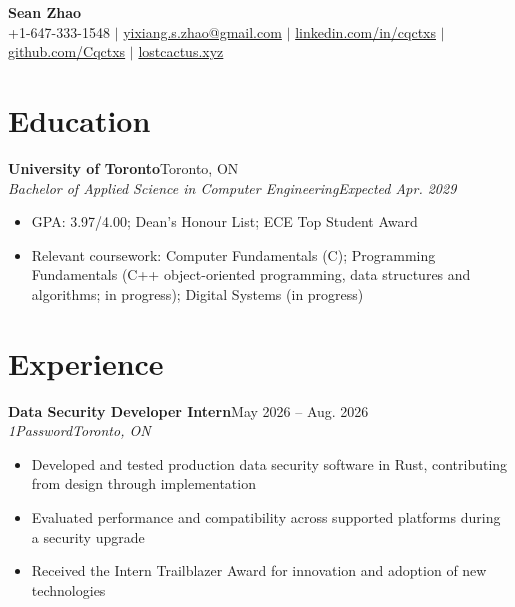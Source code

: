 \documentclass[letterpaper,11pt]{article}
\newcommand{\entry}[4]{\textbf{#1}\hfill #2\\\textit{\small #3}\hfill\textit{\small #4}\vspace{-4pt}}
\newenvironment{bullets}{\begin{itemize}[leftmargin=0.17in,itemsep=0pt,topsep=4pt,parsep=0pt]\small}{\end{itemize}\vspace{1pt}}
\begin{document}
\begin{center}
\textbf{\Huge Sean Zhao}\\[2pt]
\small +1-647-333-1548 $|$ \href{mailto:yixiang.s.zhao@gmail.com}{yixiang.s.zhao@gmail.com} $|$
\href{https://linkedin.com/in/cqctxs}{linkedin.com/in/cqctxs} $|$
\href{https://github.com/Cqctxs}{github.com/Cqctxs} $|$
\href{https://lostcactus.xyz}{lostcactus.xyz}
\end{center}
\vspace{-9pt}
\section{Education}
\entry{University of Toronto}{Toronto, ON}{Bachelor of Applied Science in Computer Engineering}{Expected Apr. 2029}
\begin{bullets}
\item GPA: 3.97/4.00; Dean's Honour List; ECE Top Student Award
\item Relevant coursework: Computer Fundamentals (C); Programming Fundamentals (C++ object-oriented programming, data structures and algorithms; in progress); Digital Systems (in progress)
\end{bullets}
\section{Experience}
\entry{Data Security Developer Intern}{May 2026 -- Aug. 2026}{1Password}{Toronto, ON}
\begin{bullets}
\item Developed and tested production data security software in Rust, contributing from design through implementation
\item Evaluated performance and compatibility across supported platforms during a security upgrade
\item Received the Intern Trailblazer Award for innovation and adoption of new technologies
\end{bullets}
\end{document}
